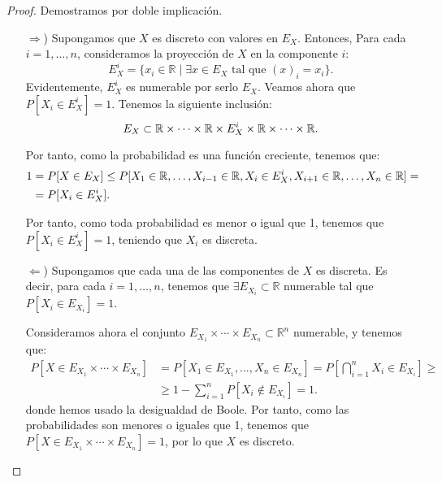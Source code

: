 \begin{proof} Demostramos por doble implicación.
    \begin{itemize}
        \item[$\Longrightarrow$)] Supongamos que $X$ es discreto con valores en $E_X$. Entonces, Para cada $i=1, \ldots, n$, consideramos la proyección de $X$ en la componente $i$:
        \begin{equation*}
            E_X^i = \{x_i\in \mathbb{R} \mid \exists x\in E_X \text{ tal que } (x)_i = x_i\}.
        \end{equation*}
        Evidentemente, $E_X^i$ es numerable por serlo $E_X$. Veamos ahora que $P[X_i\in E_X^i] = 1$. Tenemos la siguiente inclusión:
        \begin{equation*}
            E_X\subset \mathbb{R} \times \cdots \times \mathbb{R}\times E_X^i \times \mathbb{R}\times \cdots \times \mathbb{R}.
        \end{equation*}

        Por tanto, como la probabilidad es una función creciente, tenemos que:
        \begin{align*}
            1&= P[X\in E_X] \leq P[X_1\in \mathbb{R}, \ldots, X_{i-1}\in \mathbb{R}, X_i\in E_X^i, X_{i+1}\in \mathbb{R}, \ldots, X_n\in \mathbb{R}] =\\
            &= P[X_i\in E_X^i].
        \end{align*}

        Por tanto, como toda probabilidad es menor o igual que 1, tenemos que $P[X_i\in E_X^i] = 1$, teniendo que $X_i$ es discreta.

        \item[$\Longleftarrow$)] Supongamos que cada una de las componentes de $X$ es discreta. Es decir, para cada $i=1, \ldots, n$, tenemos que $\exists E_{X_i}\subset \mathbb{R}$ numerable tal que $P[X_i\in E_{X_i}] = 1$.
        
        Consideramos ahora el conjunto $E_{X_1}\times \cdots \times E_{X_n}\subset \mathbb{R}^n$ numerable, y tenemos que:
        \begin{align*}
            P[X\in E_{X_1}\times \cdots \times E_{X_n}] &= P[X_1\in E_{X_1}, \ldots, X_n\in E_{X_n}] = P\left[\bigcap_{i=1}^n X_i\in E_{X_i}\right] \geq \\
            &\geq 1- \sum_{i=1}^n P[X_i\notin E_{X_i}] = 1.
        \end{align*}
        donde hemos usado la desigualdad de Boole. Por tanto, como las probabilidades son menores o iguales que 1, tenemos que $P[X\in E_{X_1}\times \cdots \times E_{X_n}] = 1$, por lo que $X$ es discreto.
    \end{itemize}
\end{proof}

